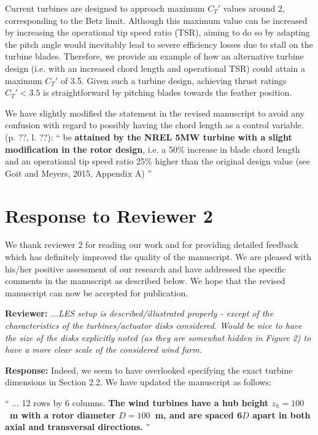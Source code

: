 \documentclass[]{article}
\begin{document}
Current turbines are designed to approach maximum $C_T'$ values around 2, corresponding to the Betz limit. Although this maximum value can be increased by increasing the operational tip speed ratio (TSR), aiming to do so by adapting the pitch angle would inevitably lead to severe efficiency losses due to stall on the turbine blades. Therefore, we provide an example of how an alternative turbine design (i.e. with an increased chord length and operational TSR) could attain a maximum $C_T'$ of 3.5. Given such a turbine design, achieving thrust ratings $C_T' < 3.5$ is straightforward by pitching blades towards the feather position. 

We have slightly modified the statement in the revised manuscript to avoid any confusion with regard to possibly having the chord length as a control variable. (p. ??, l. ??):
``
be \textbf{attained by the NREL 5MW turbine with a slight modification in the rotor design}, i.e. a 50\% increase in blade chord length and an operational tip speed ratio 25\% higher than 
the original design value (see Goit and Meyers, 2015, Appendix A)
'' 




\clearpage
\section*{Response to Reviewer 2}
We thank reviewer 2 for reading our work and for providing detailed feedback which has definitely improved the quality of the manuscript. We are pleased with his/her positive assessment of our research and have addressed the specific comments in the manuscript as described below. We hope that the revised manuscript can now be accepted for publication. 

\dotfill

\textbf{Reviewer: } \textit{...LES setup is described/illustrated properly - except of the characteristics of the turbines/actuator disks considered. Would be nice to have the size of the disks explicitly noted (as they are somewhat hidden in Figure 2) to have a more clear scale of the considered wind farm.}

\textbf{Response: } Indeed, we seem to have overlooked specifying the exact turbine dimensions in Section 2.2. We have updated the manuscript as follows: 

``
... 12 rows by 6 columns. \textbf{The wind turbines have a hub height $z_h = 100$~m with a rotor diameter $D = 100$~m, and are spaced 6$D$ apart in both axial and transversal directions.}
''
\end{document}
